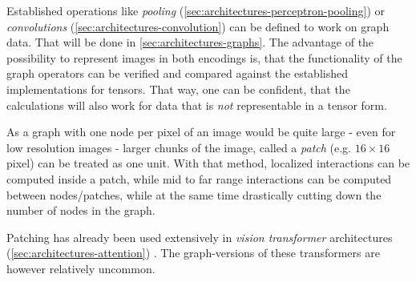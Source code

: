 Established operations like \emph{pooling} (\autoref{sec:architectures-perceptron-pooling}) or \emph{convolutions} (\autoref{sec:architectures-convolution}) can be defined to work on graph data. 
That will be done in \autoref{sec:architectures-graphs}. 
The advantage of the possibility to represent images in both encodings is, that the functionality of the graph operators can be verified and compared against the established implementations for tensors.
That way, one can be confident, that the calculations will also work for data that is \emph{not} representable in a tensor form.

As a graph with one node per pixel of an image would be quite large - even for low resolution images - larger chunks of the image, called a \emph{patch} (e.g. $16 \times 16$ pixel) can be treated as one unit. 
With that method, localized interactions can be computed inside a patch, while mid to far range interactions can be computed between nodes/patches, while at the same time drastically cutting down the number of nodes in the graph.

Patching has already been used extensively in \emph{vision transformer} architectures (\autoref{sec:architectures-attention}) \cite{dinoPaper} \cite{imageWorth16x16}. 
The graph-versions of these transformers are however relatively uncommon.

